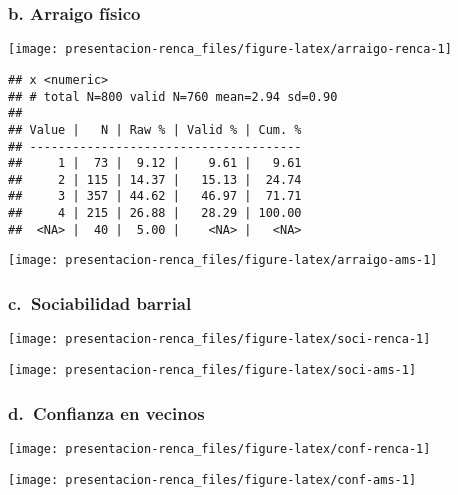 \documentclass[
]{article}
\begin{document}
\hypertarget{b.-arraigo-fuxedsico}{%
\subsubsection{b. Arraigo físico}\label{b.-arraigo-fuxedsico}}

\begin{flushleft}\texttt{[image: presentacion-renca\_files/figure-latex/arraigo-renca-1]} \end{flushleft}

\begin{verbatim}
## x <numeric> 
## # total N=800 valid N=760 mean=2.94 sd=0.90
## 
## Value |   N | Raw % | Valid % | Cum. %
## --------------------------------------
##     1 |  73 |  9.12 |    9.61 |   9.61
##     2 | 115 | 14.37 |   15.13 |  24.74
##     3 | 357 | 44.62 |   46.97 |  71.71
##     4 | 215 | 26.88 |   28.29 | 100.00
##  <NA> |  40 |  5.00 |    <NA> |   <NA>
\end{verbatim}

\begin{flushleft}\texttt{[image: presentacion-renca\_files/figure-latex/arraigo-ams-1]} \end{flushleft}

\hypertarget{c.-sociabilidad-barrial}{%
\subsubsection{c.~Sociabilidad barrial}\label{c.-sociabilidad-barrial}}

\begin{flushleft}\texttt{[image: presentacion-renca\_files/figure-latex/soci-renca-1]} \end{flushleft}

\begin{flushleft}\texttt{[image: presentacion-renca\_files/figure-latex/soci-ams-1]} \end{flushleft}

\hypertarget{d.-confianza-en-vecinos}{%
\subsubsection{d.~Confianza en vecinos}\label{d.-confianza-en-vecinos}}

\begin{flushleft}\texttt{[image: presentacion-renca\_files/figure-latex/conf-renca-1]} \end{flushleft}

\begin{flushleft}\texttt{[image: presentacion-renca\_files/figure-latex/conf-ams-1]} \end{flushleft}
\end{document}
